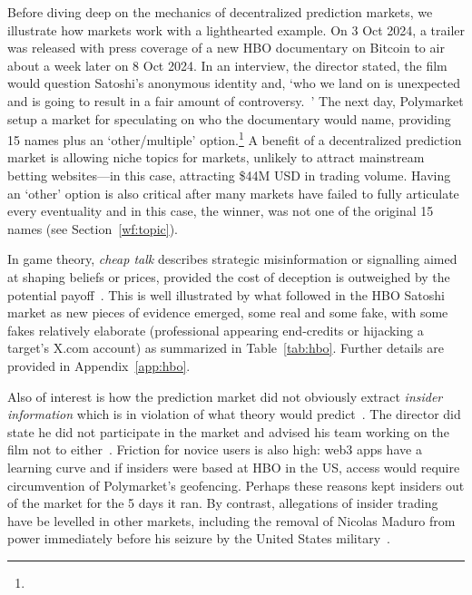 Before diving deep on the mechanics of decentralized prediction markets, we illustrate how markets work with a lighthearted example. On 3 Oct 2024, a trailer was released with press coverage of a new HBO documentary on Bitcoin to air about a week later on 8 Oct 2024. In an interview, the director stated, the film would question Satoshi's anonymous identity and, `who we land on is unexpected and is going to result in a fair amount of controversy.~\cite{Bec24}' The next day, Polymarket setup a market for speculating on who the documentary would name, providing 15 names plus an `other/multiple' option.\footnote{} A benefit of a decentralized prediction market is allowing niche topics for markets, unlikely to attract mainstream betting websites---in this case, attracting \$44M USD in trading volume. Having an `other' option is also critical after many markets have failed to fully articulate every eventuality and in this case, the winner, was not one of the original 15 names (see Section~\ref{wf:topic}).

In game theory, \textit{cheap talk} describes strategic misinformation or signalling aimed at shaping beliefs or prices, provided the cost of deception is outweighed by the potential payoff~\cite{CrSo82}. This is well illustrated by what followed in the HBO Satoshi market as new pieces of evidence emerged, some real and some fake, with some fakes relatively elaborate (professional appearing end-credits or hijacking a target's X.com account) as summarized in Table~\ref{tab:hbo}. Further details are provided in Appendix~\ref{app:hbo}.

Also of interest is how the prediction market did not obviously extract \textit{insider information} which is in violation of what theory would predict~\cite{Han07}. The director did state he did not participate in the market and advised his team working on the film not to either~\cite{Beg24}. Friction for novice users is also high: web3 apps have a learning curve and if insiders were based at HBO in the US, access would require circumvention of Polymarket's geofencing. Perhaps these reasons kept insiders out of the market for the 5 days it ran. By contrast, allegations of insider trading have be levelled in other markets, including the removal of Nicolas Maduro from power immediately before his seizure by the United States military~\cite{Alm26}.


